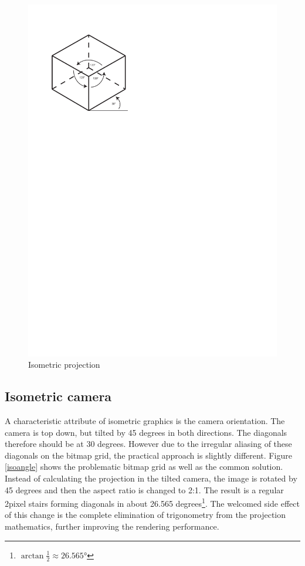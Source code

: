 \documentclass[11pt,oneside, final]{fithesis2}
\begin{document}
\begin{figure}[h]
	\centering
	\includegraphics[clip=true,trim=0 205mm 100mm 20mm]{thesis-isobox}
	\caption{Isometric projection}
	\label{isometric}
\end{figure}

\subsection{Isometric camera}
A characteristic attribute of isometric graphics is the camera orientation. The camera is top down, but tilted by 45 degrees in both directions. The diagonals therefore should be at 30 degrees. However due to the irregular aliasing of these diagonals on the bitmap grid, the practical approach is slightly different. Figure \ref{isoangle} shows the problematic bitmap grid as well as the common solution. Instead of calculating the projection in the tilted camera, the image is rotated by 45 degrees and then the aspect ratio is changed to 2:1\cite{pagella}. The result is a regular 2pixel stairs forming diagonals in about 26.565 degrees\footnote{\begin{math}\arctan \frac{1}{2} \approx 26.565\si{\degree}\end{math}}. The welcomed side effect of this change is the complete elimination of trigonometry from the projection mathematics, further improving the rendering performance.
\end{document}
